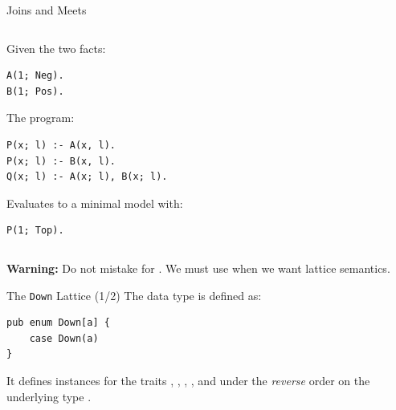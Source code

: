 \begin{frame}[fragile]{Joins and Meets}
\begin{columns}
\begin{column}{.5\textwidth}
Given the two facts:

\begin{lstlisting}[language=flix, xleftmargin=0.8cm]
A(1; Neg).
B(1; Pos).
\end{lstlisting}

The program:

\begin{lstlisting}[language=flix, xleftmargin=0.8cm]
P(x; l) :- A(x, l).
P(x; l) :- B(x, l).
Q(x; l) :- A(x; l), B(x; l).
\end{lstlisting}

Evaluates to a minimal model with:

\begin{lstlisting}[language=flix, xleftmargin=0.8cm]
P(1; Top).
\end{lstlisting}

\end{column}
\begin{column}{.5\textwidth}
\centering
{}
\end{column}
\end{columns}

\medskip

{
\small
\textbf{Warning:} Do not mistake \Code{,} for \Code{;}. We must use \Code{;}
when we want lattice semantics. 
}

\end{frame}

\begin{frame}[fragile]{The \texttt{Down} Lattice (1/2)}
The  data type is defined as: 

\begin{lstlisting}[language=flix, xleftmargin=0.8cm]
pub enum Down[a] {
    case Down(a)
}
\end{lstlisting}

It defines instances for the traits , ,
, , and  under the
\emph{reverse} order on the underlying type .
\end{frame}

